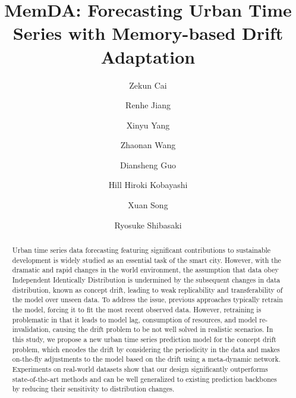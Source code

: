 \documentclass[sigconf]{acmart}
\begin{document}
\title{MemDA: Forecasting Urban Time Series with Memory-based Drift Adaptation}

\author{Zekun Cai}

\author{Renhe Jiang}

\author{Xinyu Yang}

\author{Zhaonan Wang}

\author{Diansheng Guo}
\authornotemark[2]

\author{Hill Hiroki Kobayashi}

\author{Xuan Song}

\author{Ryosuke Shibasaki}

\renewcommand{\shortauthors}{Zekun Cai, et al.}

\begin{abstract}
    Urban time series data forecasting featuring significant contributions to sustainable development is widely studied as an essential task of the smart city. However, with the dramatic and rapid changes in the world environment, the assumption that data obey Independent Identically Distribution is undermined by the subsequent changes in data distribution, known as concept drift, leading to weak replicability and transferability of the model over unseen data. To address the issue, previous approaches typically retrain the model, forcing it to fit the most recent observed data. However, retraining is problematic in that it leads to model lag, consumption of resources, and model re-invalidation, causing the drift problem to be not well solved in realistic scenarios. In this study, we propose a new urban time series prediction model for the concept drift problem, which encodes the drift by considering the periodicity in the data and makes on-the-fly adjustments to the model based on the drift using a meta-dynamic network. Experiments on real-world datasets show that our design significantly outperforms state-of-the-art methods and can be well generalized to existing prediction backbones by reducing their sensitivity to distribution changes. 
\end{abstract}
\end{document}
